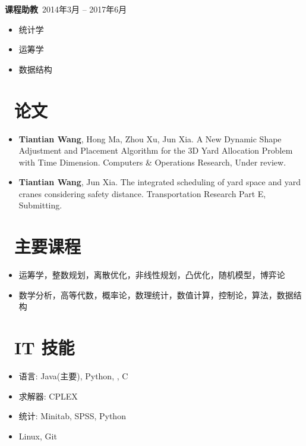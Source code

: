 \documentclass[11pt]{article}
\begin{document}
\textbf{课程助教}\  \hfill 2014年3月 -- 2017年6月

\begin{itemize}
  \item 统计学
  \item 运筹学
  \item 数据结构
\end{itemize}

\section{\makebox[\widthof{\faGraduationCap}][c]{\color{CVBlue}\faBookmarkO}\ 论文}
\begin{itemize}[parsep=0.5ex]
	\item \textbf{Tiantian Wang}, Hong Ma, Zhou Xu, Jun Xia. A New Dynamic Shape Adjustment and Placement Algorithm for the 3D Yard Allocation Problem with Time Dimension. Computers \& Operations Research, Under review.
	\item \textbf{Tiantian Wang}, Jun Xia. The integrated scheduling of yard space and yard cranes considering safety distance. Transportation Research Part E, Submitting.
\end{itemize}

\section{\makebox[\widthof{\faGraduationCap}][c]{\color{CVBlue}\faBook}\ 主要课程}
\begin{itemize}[parsep=0.5ex]
  \item 运筹学，整数规划，离散优化，非线性规划，凸优化，随机模型，博弈论
  \item 数学分析，高等代数，概率论，数理统计，数值计算，控制论，算法，数据结构
\end{itemize}

\section{\makebox[\widthof{\faGraduationCap}][c]{\color{CVBlue}\faCogs}\ IT 技能}
\begin{itemize}[parsep=0.5ex]
  \item 语言: Java(主要), Python, \Cpp, C
  \item 求解器: CPLEX
  \item 统计: Minitab, SPSS, Python
  \item Linux, Git
\end{itemize}
\end{document}
